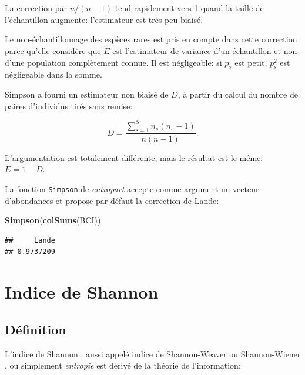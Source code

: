 \documentclass[
  11pt,
  french,
  a4paper,
  extrafontsizes,onecolumn,openright
  ]{memoir}
\newenvironment{Shaded}{\begin{snugshade}}{\end{snugshade}}
\newcommand{\FunctionTok}[1]{\textcolor[rgb]{0.13,0.29,0.53}{\textbf{#1}}}
\newcommand{\NormalTok}[1]{#1}
\begin{document}
La correction par \({n}/{\left(n-1\right)}\) tend rapidement vers 1 quand la taille de l'échantillon augmente: l'estimateur est très peu biaisé.

Le non-échantillonnage des espèces rares est pris en compte dans cette correction parce qu'elle considère que \(\tilde{E}\) est l'estimateur de variance d'un échantillon et non d'une population complètement connue.
Il est négligeable: si \(p_s\) est petit, \(p^2_s\) est négligeable dans la somme.

Simpson a fourni un estimateur non biaisé de \(D\), à partir du calcul du nombre de paires d'individus tirés sans remise:

\begin{equation}
  \label{eq:EstSimpson1949}
  \tilde{D} = \frac{\sum^{S}_{s=1}{n_s\left(n_s -1\right)}}{n\left(n-1\right)}.
\end{equation}

L'argumentation est totalement différente, mais le résultat est le même: \(\tilde{E}=1-\tilde{D}\).

La fonction \texttt{Simpson} de \emph{entropart} accepte comme argument un vecteur d'abondances et propose par défaut la correction de Lande:

\scriptsize

\begin{Shaded}
\begin{Highlighting}[]
\FunctionTok{Simpson}\NormalTok{(}\FunctionTok{colSums}\NormalTok{(BCI))}
\end{Highlighting}
\end{Shaded}

\begin{verbatim}
##     Lande 
## 0.9737209
\end{verbatim}

\normalsize

\section{Indice de Shannon}\label{indice-de-shannon}

\subsection{Définition}\label{duxe9finition-1}

L'indice de Shannon \autocite{Shannon1948,Shannon1963}, aussi appelé indice de Shannon-Weaver ou Shannon-Wiener \autocite{Spellerberg2003}, ou simplement \emph{entropie} est dérivé de la théorie de l'information:
\end{document}
